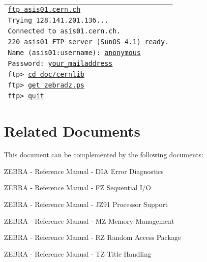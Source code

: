 \vspace*{3mm} 
\begin{tabular}{@{\hspace{12mm}}>{\tt}l}
\underline{ftp asis01.cern.ch}\\
Trying 128.141.201.136...\\
Connected to asis01.cern.ch.\\
220 asis01 FTP server (SunOS 4.1) ready.\\
Name (asis01:username): \underline{anonymous}\\
Password: \underline{your\_{}mailaddress}\\
ftp> \underline{cd doc/cernlib}\\
ftp> \underline{get zebradz.ps}\\
ftp> \underline{quit}\\
\end{tabular}
\vspace*{3mm} 

\section*{Related Documents}

This document can be complemented by the following documents:
\begin{UL}
\item ZEBRA - Reference Manual - DIA Error Diagnostics~\cite{bib-ZEBRADIA} 
\item ZEBRA - Reference Manual - FZ Sequential I/O~\cite{bib-ZEBRAFZ} 
\item ZEBRA - Reference Manual - JZ91 Processor Support~\cite{bib-ZEBRAJZ91} 
\item ZEBRA - Reference Manual - MZ Memory Management~\cite{bib-ZEBRAMZ} 
\item ZEBRA - Reference Manual - RZ Random Access Package~\cite{bib-ZEBRARZ} 
\item ZEBRA - Reference Manual - TZ Title Handling~\cite{bib-ZEBRATZ} 
\end{UL}

\newpage

\tableofcontents
\listoffigures
\cleardoublepage
